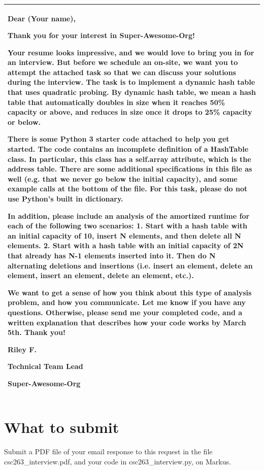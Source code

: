\documentclass{article}
\begin{document}
\begin{tabular}{|l|}
\hline
\begin{minipage}{0.8\linewidth}
\setlength{\parskip}{\baselineskip}
	\vspace{.2cm}
Dear (Your name),

Thank you for your interest in Super-Awesome-Org!

Your resume looks impressive, and we would love to bring you in for an interview. But before we schedule an on-site, we
want you to attempt the attached task so that we can discuss your solutions during the interview.
The task is to implement a dynamic hash table that uses quadratic probing. By dynamic hash table, we mean a hash table that automatically doubles in size when it reaches 50\% capacity or above, and reduces in size
once it drops to 25\% capacity or below.

There is some Python 3 starter code attached to help you get started. The code contains an incomplete definition of
a HashTable class. In particular, this class has a self.array attribute, which is the address table. There are some
additional specifications in this file as well (e.g. that we never go below the initial capacity), and some example calls at
the bottom of the file. For this task, please do not use Python’s built in dictionary.

In addition, please include an analysis of the amortized runtime for each of the following two scenarios:
1. Start with a hash table with an initial capacity of 10, insert N elements, and then delete all N elements.
2. Start with a hash table with an initial capacity of 2N that already has N-1 elements inserted into it. Then do N
alternating deletions and insertions (i.e. insert an element, delete an element, insert an element, delete an element,
etc.).

We want to get a sense of how you think about this type of analysis problem, and how you communicate.
Let me know if you have any questions. Otherwise, please send me your completed code, and a written explanation that
describes how your code works by March 5th. Thank you!

Riley F.

Technical Team Lead

Super-Awesome-Org
	\vspace{.2cm}
\end{minipage} \\ \hline
\end{tabular}

\section*{\large What to submit} 
Submit a PDF file of your email response to this request in the file csc263\_interview.pdf, and your code in csc263\_interview.py, on Markus.
\end{document}
